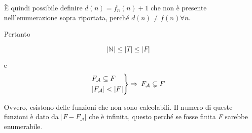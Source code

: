 È quindi possibile definire  $d(n) = f_n(n) +1$ che non è
presente nell'enumerazione sopra riportata, perché $ d(n) \neq f(n) \forall n$.

Pertanto 

$$ |\mathbb{N}| \leq |T| \leq |F|$$

e
$$
\begin{rcases}
F_\mathcal{A} \subseteq F \\
|F_\mathcal{A}| < |F|
\end{rcases}
 \Rightarrow \: F_\mathcal{A} \subsetneq F
$$

Ovvero, esistono delle funzioni che non sono calcolabili. Il numero di
queste funzioni è dato da $ | F - F_\mathcal{A}| $ che è
infinita, questo perché se fosse finita \textit{F} sarebbe enumerabile.
